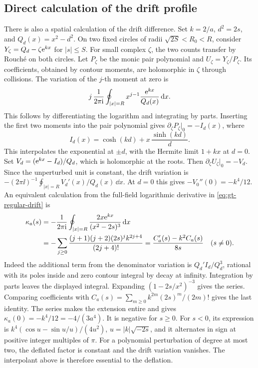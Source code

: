 \subsection{Direct calculation of the drift profile}
\label{sec:gt-drift-kernel}

There is also a spatial calculation of the drift difference.
Set \(k=2/a\), \(d^2=2s\), and \(Q_d(x)=x^2-d^2\). On two fixed
circles of radii \(\sqrt{2S}<R_0<R\), consider
\(Y_\zeta=Q_d-\zeta\mathrm e^{kx}\) for \(|s|\le S\).
For small complex \(\zeta\), the two counts transfer by Rouch\'e
on both circles. Let \(P_\zeta\) be the monic pair polynomial
and \(U_\zeta=Y_\zeta/P_\zeta\). Its coefficients, obtained by
contour moments, are holomorphic in \(\zeta\) through collisions.
The variation of the \(j\)-th moment at zero is
\[
 j\,\frac1{2\pi\mathrm i}\oint_{|x|=R} x^{j-1}
          \frac{\mathrm e^{kx}}{Q_d(x)}\,\mathrm d x .
\]
This follows by differentiating the logarithm and integrating by
parts. Inserting the first two moments into the pair polynomial
gives \(\partial_\zeta P_\zeta|_0=-I_d(x)\), where
\[
 I_d(x)=\cosh(kd)+x\,\frac{\sinh(kd)}{d}.
\]
This interpolates the exponential at \(\pm d\), with the Hermite
limit \(1+kx\) at \(d=0\). Set \(V_d=(\mathrm e^{kx}-I_d)/Q_d\), which
is holomorphic at the roots. Then
\(\partial_\zeta U_\zeta|_0=-V_d\). Since the unperturbed unit is
constant, the drift variation is
\(- (2\pi\ii)^{-1}\oint_{|x|=R} V_d'(x)/Q_d(x)\,\dd x\).
At \(d=0\) this gives \(-V_0''(0)=-k^4/12\). An
equivalent calculation from the full-field logarithmic derivative
in \eqref{eq:gt-regular-drift} is
\begin{align}
 \kappa_a(s)
   &=-\frac1{2\pi\mathrm i}\oint_{|x|=R}
             \frac{2x\mathrm e^{kx}}{(x^2-2s)^3}\,\mathrm d x\notag\\
   &=-\sum_{j\ge0}
       \frac{(j+1)(j+2)(2s)^j k^{2j+4}}{(2j+4)!}
    =\frac{C_a'(s)-k^2 C_a(s)}{8s}\quad(s\ne0).
 \label{eq:gt-drift-kernel}
\end{align}
Indeed the additional term from the denominator variation is
\(Q_d'I_d/Q_d^3\), rational with its poles inside and zero
contour integral by decay at infinity. Integration by parts
leaves the displayed integral. Expanding
\((1-2s/x^2)^{-3}\) gives the series. Comparing coefficients
with \(C_a(s)=\sum_{m\ge0}k^{2m}(2s)^m/(2m)!\) gives the last
identity. The series makes the extension entire and gives
\(\kappa_a(0)=-k^4/12=-4/(3a^4)\). It is negative for \(s\ge0\).
For \(s<0\), its expression is
\(k^4(\cos u-\sin u/u)/(4u^2)\), \(u=|k|\sqrt{-2s}\), and
it alternates in sign at positive integer multiples of \(\pi\).
For a polynomial perturbation of degree at most two, the
deflated factor is constant and the drift variation vanishes.
The interpolant above is therefore essential to the deflation.

